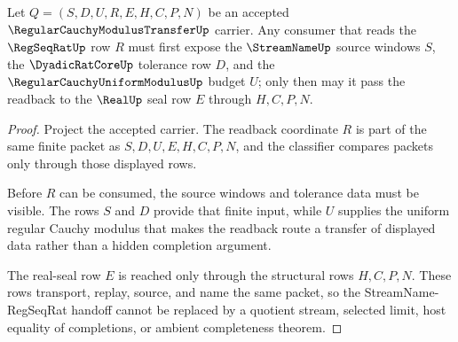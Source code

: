 \begin{theorem}
\label{thm:regular-cauchy-modulus-transfer-streamname-handoff}
Let $Q=(S,D,U,R,E,H,C,P,N)$ be an accepted $\RegularCauchyModulusTransferUp$ carrier. Any consumer that reads the $\RegSeqRatUp$ row $R$ must first expose the $\StreamNameUp$ source windows $S$, the $\DyadicRatCoreUp$ tolerance row $D$, and the $\RegularCauchyUniformModulusUp$ budget $U$; only then may it pass the readback to the $\RealUp$ seal row $E$ through $H,C,P,N$.
\end{theorem}
\begin{proof}
Project the accepted carrier. The readback coordinate $R$ is part of the same finite packet as $S,D,U,E,H,C,P,N$, and the classifier compares packets only through those displayed rows.

Before $R$ can be consumed, the source windows and tolerance data must be visible. The rows $S$ and $D$ provide that finite input, while $U$ supplies the uniform regular Cauchy modulus that makes the readback route a transfer of displayed data rather than a hidden completion argument.

The real-seal row $E$ is reached only through the structural rows $H,C,P,N$. These rows transport, replay, source, and name the same packet, so the StreamName-RegSeqRat handoff cannot be replaced by a quotient stream, selected limit, host equality of completions, or ambient completeness theorem.
\end{proof}




